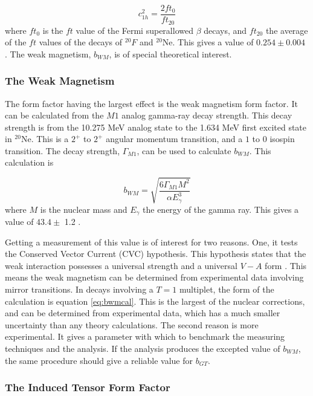 \documentclass[../MaxHughesThesis.tex]{subfiles}
\begin{document}
\begin{equation}
	c_{1h}^{2} = \frac{2 ft_{0}}{ft_{20}}
	\label{eq:c1eq}
\end{equation}
where $ft_{0}$ is the $ft$ value of the Fermi superallowed $\beta$ decays, and $ft_{20}$ the average of the $ft$ values of the decays of $^{20}F$ and $^{20}$Ne.
This gives a value of $0.254 \pm 0.004$ \cite{Min11}.
The weak magnetism, $b_{WM}$, is of special theoretical interest. 

\subsubsection{The Weak Magnetism}
The form factor having the largest effect is the weak magnetism form factor. 
It can be calculated from the $M1$ analog gamma-ray decay strength.
This decay strength is from the 10.275 MeV analog state to the 1.634 MeV first excited state in $^{20}$Ne.
This is a $2^{+}$ to $2^{+}$ angular momentum transition, and a $1$ to $0$ isospin transition.
The decay strength, $\Gamma_{M1}$, can be used to calculate $b_{WM}$.
This calculation is 

\begin{equation}
	b_{WM} = \sqrt{\frac{6\Gamma_{M1}M^{2}}{\alpha E_{\gamma}^{3}}}
	\label{eq:bwmcal}
\end{equation}
where $M$ is the nuclear mass and $E_{\gamma}$ the energy of the gamma ray.
This gives a value of $43.4 \pm$ 1.2 \cite{Min11}.

Getting a measurement of this value is of interest for two reasons.
One, it tests the Conserved Vector Current (CVC) hypothesis.
This hypothesis states that the weak interaction possesses a universal strength and a universal $V-A$ form \cite{Man58}.
This means the weak magnetism can be determined from experimental data involving mirror transitions.
In decays involving a $T = 1$ multiplet, the form of the calculation is equation \ref{eq:bwmcal}. 
This is the largest of the nuclear corrections, and can be determined from experimental data, which has a much smaller uncertainty than any theory calculations.
The second reason is more experimental.
It gives a parameter with which to benchmark the measuring techniques and the analysis.
If the analysis produces the excepted value of $b_{WM}$, the same procedure should give a reliable value for $b_{GT}$.

\subsubsection{The Induced Tensor Form Factor}
\end{document}
